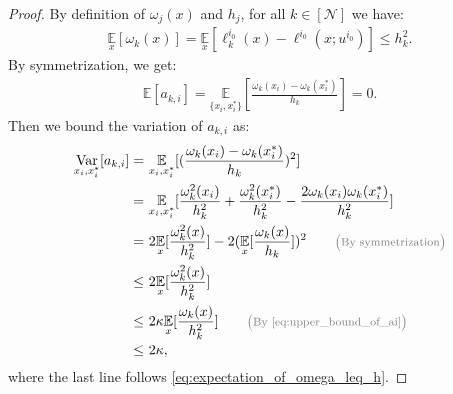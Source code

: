 \documentclass[12pt]{article}
\numberwithin{equation}{section}
\DeclareMathOperator*{\E}{{\mathbb{E}}}
\def\E{\mathbb{E}}
\theoremstyle{theoremstyle}
\numberwithin{equation}{section}
\numberwithin{theorem}{section}
\numberwithin{proposition}{section}
\numberwithin{definition}{section}
\numberwithin{lemma}{section}
\numberwithin{assumption}{section}
\numberwithin{remark}{section}
\newcommand*{\annot}[1]{\tag*{\footnotesize{\textcolor{black!50}{\big(#1\big)}}}}
\begin{document}
\begin{proof}
By definition of $\omega_j(x)$ and $h_j$, for all $k\in[\mathcal{N}]$ we have:
\begin{align}\label{eq:expectation_of_omega_leq_h}
    \underset{x}{\E}[\omega_k(x)]=\underset{x}{\E}[\ell^{i_0}_k(x)-\ell^{i_0}(x;u^{i_0})]\leq h_k^2.
\end{align}
By symmetrization, we get:
\begin{align}\label{eq:expectation_of_ai}
    \E[a_{k,i}]=\underset{\{x_i,x_i^*\}}{\E}[\frac{\omega_k(x_i)-\omega_k(x_i^*)}{h_k}]=0.
\end{align}
Then we bound the variation of $a_{k,i}$ as:
\begin{align}
    \underset{x_i,x_i^*}{\rm Var}[a_{k,i}]= & ~
    \underset{x_i,x_i^*}{\E}[(\frac{\omega_k(x_i)-\omega_k(x_i^*)}{h_k})^2] \notag\\
    = & ~
    \underset{x_i,x_i^*}{\E}[\frac{\omega_k^2(x_i)}{h_k^2}+\frac{\omega_k^2(x_i^*)}{h_k^2}-\frac{2\omega_k(x_i)\omega_k(x_i^*)}{h_k^2}] \notag\\
    = & ~
    2\underset{x}{\E}[\frac{\omega_k^2(x)}{h_k^2}]-2(\underset{x}{\E}[\frac{\omega_k(x)}{h_k}])^2 \annot{By symmetrization} \\
    \leq & ~
    2\underset{x}{\E}[\frac{\omega_k^2(x)}{h_k^2}] \notag\\
    \leq & ~
    2\kappa\underset{x}{\E}[\frac{\omega_k(x)}{h_k^2}] \annot{By \eqref{eq:upper_bound_of_ai}}\\
    \label{eq:variation_of_ai}
    \leq & ~ 
    2\kappa,
\end{align}
where the last line follows \eqref{eq:expectation_of_omega_leq_h}.


\end{proof}
\end{document}
